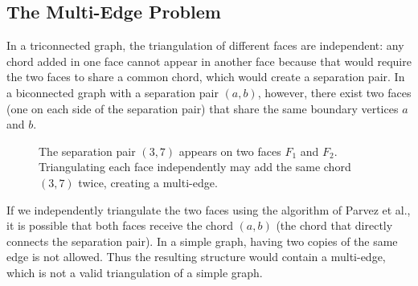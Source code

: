 \subsection{The Multi-Edge Problem}
\label{subsec:multiedge_problem}

In a triconnected graph, the triangulation of different faces are independent: any chord added in one face cannot appear in another face because that would require the two faces to share a common chord, which would create a separation pair. 
In a biconnected graph with a separation pair \((a,b)\), however, there exist two faces (one on each side of the separation pair) that share the same boundary vertices \(a\) and \(b\).

\begin{figure}[htbp]
    \centering
    \caption{The separation pair \((3,7)\) appears on two faces \(F_1\) and \(F_2\). Triangulating each face independently may add the same chord \((3,7)\) twice, creating a multi-edge.}
    \label{fig:paper_multiedge}
\end{figure}

If we independently triangulate the two faces using the algorithm of Parvez et al., it is possible that both faces receive the chord \((a,b)\) (the chord that directly connects the separation pair). 
In a simple graph, having two copies of the same edge is not allowed. 
Thus the resulting structure would contain a multi-edge, which is not a valid triangulation of a simple graph.

